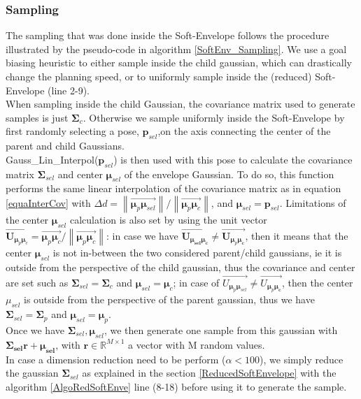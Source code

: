 \documentclass[letterpaper, 10 pt, conference]{ieeeconf}  %
\newcommand{\mb}[1]{{\boldsymbol{#1}}}
\newcommand\norm[1]{\left\lVert#1\right\rVert}
\begin{document}
\subsubsection{Sampling}\leavevmode\par \label{samplingSection}
The sampling that was done inside the Soft-Envelope follows the procedure illustrated by the pseudo-code in algorithm \ref{SoftEnv_Sampling}.
We use a goal biasing heuristic to either sample inside the child gaussian, which can drastically change the planning speed, or to uniformly sample inside the (reduced) Soft-Envelope (line 2-9). \\
When sampling inside the child Gaussian, the covariance matrix used to generate samples is just $\mb{\Sigma}_c$. Otherwise we sample uniformly inside the Soft-Envelope by first randomly selecting a pose, $\mb{p}_{sel}$,on the axis connecting the center of the parent and child Gaussians.\\
 {\selectfont Gauss\_Lin\_Interpol($\mb{p}_{sel}$)} is then used with this pose to calculate the covariance matrix $\mb{\Sigma}_{sel}$ and center $\mb{\mu}_{sel}$ of the envelope Gaussian. To do so, this function performs the same linear interpolation of the covariance matrix as in equation \ref{equaInterCov} with  $\Delta d = \norm{\overrightarrow{\mb{\mu}_p\mb{\mu}_{sel}}}/{\norm{\overrightarrow{\mb{\mu}_p\mb{\mu}_c}}}$, and $\mb{\mu}_{sel} = \mb{p}_{sel}$. Limitations of the center $\mb{\mu}_{sel}$ calculation is also set by using the unit vector $\overrightarrow{\mb{U}_{\mb{\mu}_p\mb{\mu}_{c}}} = \overrightarrow{\mb{\mu}_p\mb{\mu}_{c}}/\norm{\overrightarrow{\mb{\mu}_p\mb{\mu}_{c}}}$: in case we have $\overrightarrow{\mb{U}_{\mb{\mu_{sel}}\mb{\mu_{c}}}} \neq \overrightarrow{\mb{U}_{\mb{\mu}_p\mb{\mu_{c}}}} $, then it means that the center $\mb{\mu}_{sel}$ is not in-between the two considered parent/child gaussians, ie it is outside from the perspective of the child gaussian, thus the covariance and center are set such as $\mb{\Sigma}_{sel}=\mb{\Sigma}_c$ and $\mb{\mu}_{sel}=\mb{\mu}_c$; in case of $\overrightarrow{U_{\mb{\mu}_{p}\mb{\mu}_{sel}}} \neq \overrightarrow{U_{\mb{\mu}_p\mb{\mu_{c}}}} $, then the center $\mu_{sel}$ is outside from the perspective of the parent gaussian, thus we have $\mb{\Sigma}_{sel}=\mb{\Sigma}_p$ and $\mb{\mu}_{sel}=\mb{\mu}_p$.\\
Once we have $\mb{\Sigma}_{sel}, \mb{\mu}_{sel}$, we then generate one sample from this gaussian with $\mb{\Sigma_{sel}}\mb{r}+\mb{\mu_{sel}}$, with $\mb{r} \in \mathbb{R}^{M \times 1}$ a vector with M random values. \\
In case a dimension reduction need to be perform ($\alpha<100$), we simply reduce the gaussian $\mb{\Sigma}_{sel}$ as explained in the section \ref{ReducedSoftEnvelope} with the algorithm \ref{AlgoRedSoftEnve} line (8-18) before using it to generate the sample. \\
\end{document}
